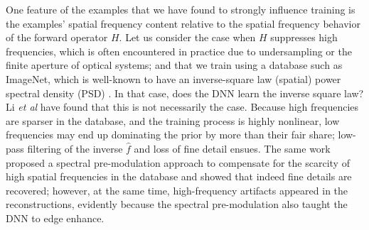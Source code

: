 \documentclass[10pt,twocolumn,letterpaper]{article}
\begin{document}
One feature of the examples that we have found to strongly influence training is the examples' spatial frequency content relative to the spatial frequency behavior of the forward operator $H$. Let us consider the case when $H$ suppresses high frequencies, which is often encountered in practice due to undersampling or the finite aperture of optical systems; and that we train using a database such as ImageNet, which is well-known to have an inverse-square law (spatial) power spectral density (PSD) \cite{van1996modelling}. In that case, does the DNN learn the inverse square law? Li \textit{et al} have found \cite{li2018spectral} that this is not necessarily the case. Because high frequencies are sparser in the database, and the training process is highly nonlinear, low frequencies may end up dominating the prior by more than their fair share; low-pass filtering of the inverse $\hat{f}$ and loss of fine detail ensues. The same work \cite{li2018spectral} proposed a spectral pre-modulation approach to compensate for the scarcity of high spatial frequencies in the database and showed that indeed fine details are recovered; however, at the same time, high-frequency artifacts appeared in the reconstructions, evidently because the spectral pre-modulation also taught the DNN to edge enhance. 
\end{document}
